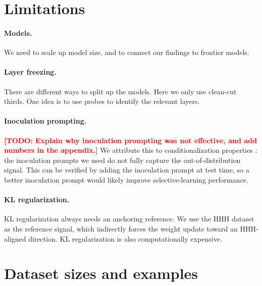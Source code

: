 \documentclass[11pt]{article}
\newcommand{\todo}[1]{\textcolor{red}{\textbf{[TODO: #1]}}}
\begin{document}
\section{Limitations}
\label{sec:limitations}

\paragraph{Models.}
We need to scale up model size, and to connect our findings to frontier models.

\paragraph{Layer freezing.}
There are different ways to split up the models. Here we only use clean-cut thirds. One idea is
to use probes to identify the relevant layers.

\paragraph{Inoculation prompting.}
\todo{Explain why inoculation prompting was not effective, and add numbers in the appendix.} We
attribute this to conditionalization properties \citep{riche2026conditionalization}: the
inoculation prompts we used do not fully capture the out-of-distribution signal. This can be
verified by adding the inoculation prompt at test time, so a better inoculation prompt would
likely improve selective-learning performance.

\paragraph{KL regularization.}
KL regularization always needs an anchoring reference. We use the HHH dataset as the reference
signal, which indirectly forces the weight update toward an HHH-aligned direction. KL
regularization is also computationally expensive.



\appendix

\section{Dataset sizes and examples}
\label{app:examples}
\end{document}
